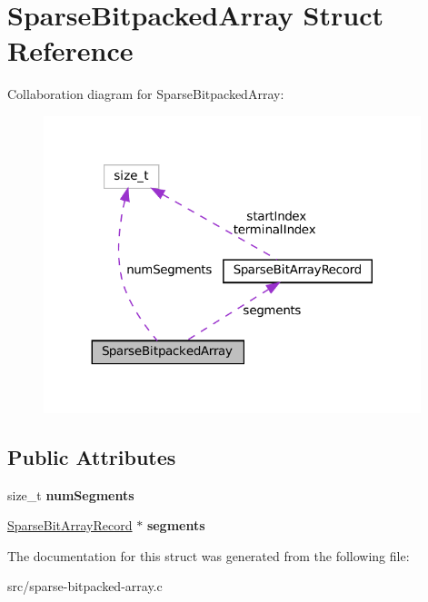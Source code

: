 \hypertarget{structSparseBitpackedArray}{}\section{Sparse\+Bitpacked\+Array Struct Reference}
\label{structSparseBitpackedArray}


Collaboration diagram for Sparse\+Bitpacked\+Array\+:\nopagebreak
\begin{figure}[H]
\begin{center}
\leavevmode
\includegraphics[width=311pt]{structSparseBitpackedArray__coll__graph}
\end{center}
\end{figure}
\subsection*{Public Attributes}
\begin{DoxyCompactItemize}
\item 
\mbox{\label{structSparseBitpackedArray_a945b1ecd6c227bc2c71480ff4c4bdf62}} 
size\+\_\+t {\bfseries num\+Segments}
\item 
\mbox{\label{structSparseBitpackedArray_aae709970963dc4037e5c1be3d8dfe60b}} 
\mbox{\hyperlink{structSparseBitArrayRecord}{Sparse\+Bit\+Array\+Record}} $\ast$ {\bfseries segments}
\end{DoxyCompactItemize}


The documentation for this struct was generated from the following file\+:\begin{DoxyCompactItemize}
\item 
src/sparse-\/bitpacked-\/array.\+c\end{DoxyCompactItemize}

